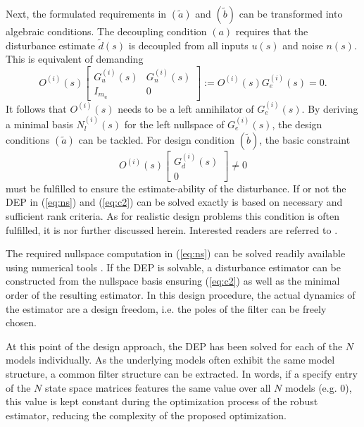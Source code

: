 \documentclass[graybox]{svmult}
\begin{document}
Next, the formulated requirements in $(\tilde a)$ and $(\tilde b)$ can be transformed into  algebraic conditions. 
The decoupling condition $(a)$ requires that the disturbance estimate $\tilde d(s)$ is decoupled from all inputs $u(s)$ and noise $n(s)$. This is equivalent of demanding 
\begin{equation}\label{eq:ns}
O^{(i)}(s) 
\begin{bmatrix}
G_u^{(i)}(s) & G^{(i)}_{n}(s)  \\ I_{m_u}& 0
\end{bmatrix}
:= O^{(i)}(s) G_e^{(i)}(s) =  0.
\end{equation}
It follows that $O^{(i)}(s)$ needs to be a left annihilator of $G_e^{(i)}(s)$. 
By deriving a minimal basis $N_l^{(i)}(s)$ for the left nullspace of $G_e^{(i)}(s)$,  the design conditions $(\tilde a)$ can be tackled. For design condition $(\tilde b)$, the basic constraint
\begin{equation}\label{eq:c2}
O^{(i)}(s) 
\begin{bmatrix}
G_{d}^{(i)}(s)  \\  0
\end{bmatrix}
\neq  0
\end{equation}
must be fulfilled to ensure the estimate-ability of the disturbance. If or not the DEP in (\ref{eq:ns}) and (\ref{eq:c2}) can be solved exactly is based on  necessary and sufficient rank criteria. As for realistic design problems this condition is often fulfilled, it is nor further discussed herein. Interested readers are referred to \cite{Var09, Ossmann18ccta, Varga17}.

The required nullspace computation in (\ref{eq:ns})  can  be solved readily available using numerical tools \cite{Varga17}. If the DEP is solvable, a disturbance estimator can be constructed from the nullspace basis ensuring (\ref{eq:c2}) as well as the minimal order of the resulting estimator. In this design procedure, the actual dynamics of the estimator are a design freedom, i.e. the poles of the filter can be freely chosen.

At this point of the design approach, the DEP has been solved for each of the $N$ models individually. As the underlying models often exhibit the same model structure, a common filter structure can be extracted. In words, if a specify entry
of the $N$ state space matrices features the same value over all $N$ models (e.g. 0), this value is kept constant during the optimization process of the robust estimator, reducing the complexity of the proposed optimization.
\end{document}
